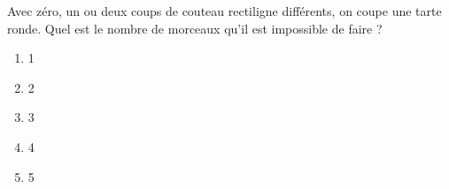Avec zéro, un ou deux coups de couteau rectiligne différents, on coupe
une tarte ronde. Quel est le nombre de morceaux qu'il est impossible
de faire ?
\begin{multicols}{5}
  \begin{enumerate}[A/]
  \item 1
  \item 2
  \item 3
  \item 4
  \item 5
  \end{enumerate}
\end{multicols}